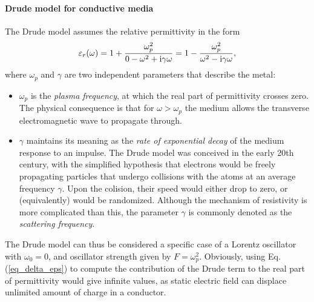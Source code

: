 \paragraph{Drude model for conductive media} %
The Drude model assumes the relative permittivity in the form
\begin{equation} {\varepsilon_r}(\omega) = 1 + \frac{\omega_p^{2}}{0 - \omega^{2} + {\mathrm i}\gamma\omega} = 1 - \frac{\omega_p^{2}}{\omega^{2} - {\mathrm i}\gamma\omega}, \label{eq_drude_eps}\end{equation}
where $\omega_p$ and $\gamma$ are two independent parameters that describe the metal: 
\begin{itemize}
 \item{$\omega_p$ is the \textit{plasma frequency}, at which the real part of permittivity crosses zero. The physical consequence is that for $\omega > \omega_p$ the medium allows the transverse electromagnetic wave to propagate through. 
 } 
 \item{$\gamma$ maintains its meaning as the \textit{rate of exponential decay} of the medium response to an impulse. The Drude model was conceived in the early 20th century, with the simplified hypothesis that electrons would be freely propagating particles that undergo collisions with the atoms at an average frequency $\gamma$. Upon the colision, their speed would either drop to zero, or (equivalently) would be randomized. Although the mechanism of resistivity is more complicated than this, the parameter $\gamma$ is commonly denoted as the \textit{scattering frequency}.} 
 \end{itemize}
The Drude model can thus be considered a specific case of a Lorentz oscillator with $\omega_0 = 0$, and oscillator strength given by $F = \omega_p^2$. 
Obviously, using Eq. (\ref{eq_delta_eps}) to compute the contribution of the Drude term to the real part of permittivity would give infinite values, as static electric field can displace unlimited amount of charge in a conductor.

